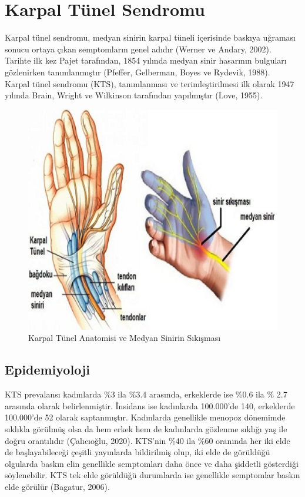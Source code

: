 \documentclass[12pt,twoside]{deuthesis}
\begin{document}
\hypertarget{KTSTanim}{%
\chapter{Karpal Tünel Sendromu}\label{KTSTanim}}

Karpal tünel sendromu, medyan sinirin karpal tüneli içerisinde baskıya uğraması sonucu ortaya çıkan semptomların genel adıdır (Werner ve Andary, 2002).\\
Tarihte ilk kez Pajet tarafından, 1854 yılında medyan sinir hasarının bulguları gözlenirken tanımlanmıştır (Pfeffer, Gelberman, Boyes ve Rydevik, 1988).\\
Karpal tünel sendromu (KTS), tanımlanması ve terimleştirilmesi ilk olarak 1947 yılında Brain, Wright ve Wilkinson tarafından yapılmıştır (Love, 1955).
\begin{figure}

{\centering \includegraphics[width=4.72in]{figure/karpal_tunnel} 

}

\caption{Karpal Tünel Anatomisi ve Medyan Sinirin Sıkışması}\label{fig:unnamed-chunk-1}
\end{figure}
\hypertarget{KTSEpidemiyoloji}{%
\section{Epidemiyoloji}\label{KTSEpidemiyoloji}}

KTS prevalansı kadınlarda \%3 ila \%3.4 arasında, erkeklerde ise \%0.6 ila \% 2.7 arasında olarak
belirlenmiştir. İnsidans ise kadınlarda 100.000'de 140, erkeklerde 100.000'de 52 olarak saptanmıştır.
Kadınlarda genellikle menopoz dönemimde sıklıkla görülmüş olsa da hem erkek hem de kadınlarda
gözlenme sıklığı yaş ile doğru orantılıdır (Çalıcıoğlu, 2020). KTS'nin \%40 ila \%60 oranında her iki elde de başlayabileceği çeşitli yayınlarda bildirilmiş olup, iki elde de görüldüğü olgularda baskın elin genellikle semptomları daha önce ve daha şiddetli gösterdiği söylenebilir. KTS tek elde görüldüğü durumlarda ise genellikle semptomlar baskın elde görülür (Bagatur, 2006).
\end{document}

